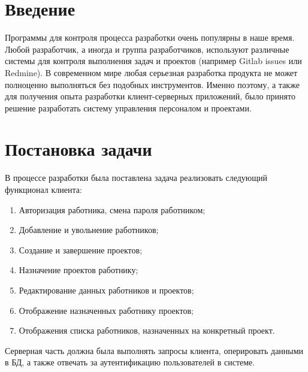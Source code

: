\documentclass[14pt, a4paper]{extarticle}
\begin{document}
    \renewcommand\contentsname{Оглавление} %
    \tableofcontents
    \setcounter{page}{2}

    \pagebreak
    \section*{Введение}
    Программы для контроля процесса разработки очень популярны в наше время. Любой разработчик, а иногда и группа разработчиков, используют различные системы для контроля выполнения задач и проектов (например Gitlab issues или Redmine). В современном мире любая серьезная разработка продукта не может полноценно выполняться без подобных инструментов. Именно поэтому, а также для получения опыта разработки клиент-серверных приложений, было принято решение разработать систему управления персоналом и проектами.


    \clearpage
    \section{Постановка задачи}
    В процессе разработки была поставлена задача реализовать следующий функционал клиента:
    \begin{enumerate} 
        \item Авторизация работника, смена пароля работником;
        \item Добавление и увольнение работников;
        \item Создание и завершение проектов;
        \item Назначение проектов работнику;
        \item Редактирование данных работников и проектов;
        \item Отображение назначенных работнику проектов;
        \item Отображения списка работников, назначенных на конкретный проект.
    \end{enumerate}
    Серверная часть должна была выполнять запросы клиента, оперировать данными в БД, а также отвечать за аутентификацию пользователей в системе.
\end{document}
